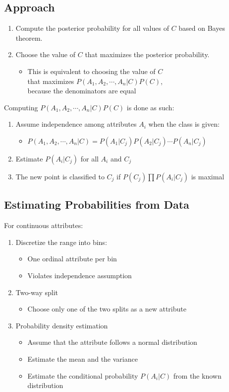 \subsection{Approach}
\begin{enumerate}
    \item Compute the posterior probability for all values of $C$ based on Bayes theorem.
    \item Choose the value of $C$ that maximizes the posterior probability.
    \begin{itemize}
        \item This is equivalent to choosing the value of $C$ \\ that maximizes $P(A_1, A_2, \cdots, A_n | C) P(C)$, \\ because the denominators are equal
    \end{itemize}
\end{enumerate}
\medskip

Computing $P(A_1, A_2, \cdots, A_n | C) P(C)$ is done as such:
\begin{enumerate}
    \item Assume independence among attributes $A_i$ when the class is given:
    \begin{itemize}
        \item $P(A_1, A_2, \cdots, A_n | C) = P(A_1|C_j) P(A_2|C_j) \cdots P(A_n|C_j)$ 
    \end{itemize}
    \item Estimate $P(A_i|C_j)$ for all $A_i$ and $C_j$
    \item The new point is classified to $C_j$ if $P(C_j)\prod P(A_i|C_j)$ is maximal
\end{enumerate}

\subsection{Estimating Probabilities from Data}
For continuous attributes:
\begin{enumerate}
    \item Discretize the range into bins:
    \begin{itemize}
        \item One ordinal attribute per bin
        \item Violates independence assumption
    \end{itemize}
    \item Two-way split
    \begin{itemize}
        \item Choose only one of the two splits as a new attribute
    \end{itemize}
    \item Probability density estimation
    \begin{itemize}
        \item Assume that the attribute follows a normal distribution
        \item Estimate the mean and the variance
        \item Estimate the conditional probability $P(A_i|C)$ from the known distribution
    \end{itemize}
\end{enumerate}

